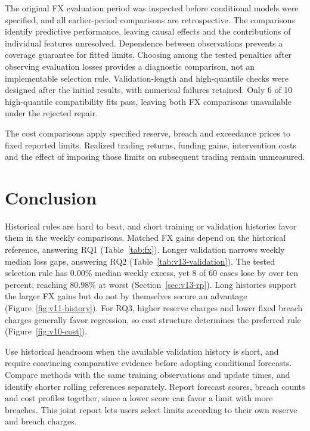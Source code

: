 \documentclass[11pt,a4paper]{article}
\begin{document}
The original FX evaluation period was inspected before conditional models were specified, and all earlier-period comparisons are retrospective. The comparisons identify predictive performance, leaving causal effects and the contributions of individual features unresolved. Dependence between observations prevents a coverage guarantee for fitted limits. Choosing among the tested penalties after observing evaluation losses provides a diagnostic comparison, not an implementable selection rule. Validation-length and high-quantile checks were designed after the initial results, with numerical failures retained. Only 6 of 10 high-quantile compatibility fits pass, leaving both FX comparisons unavailable under the rejected repair.

The cost comparisons apply specified reserve, breach and exceedance prices to fixed reported limits. Realized trading returns, funding gains, intervention costs and the effect of imposing those limits on subsequent trading remain unmeasured.

\FloatBarrier

\section{Conclusion}\label{sec:conclusion}

Historical rules are hard to beat, and short training or validation histories favor them in the weekly comparisons. Matched FX gains depend on the historical reference, answering RQ1 (Table~\ref{tab:fx}). Longer validation narrows weekly median loss gaps, answering RQ2 (Table~\ref{tab:v13-validation}). The tested selection rule has 0.00\% median weekly excess, yet 8 of 60 cases lose by over ten percent, reaching 80.98\% at worst (Section~\ref{sec:v13-rp}). Long histories support the larger FX gains but do not by themselves secure an advantage (Figure~\ref{fig:v11-history}). For RQ3, higher reserve charges and lower fixed breach charges generally favor regression, so cost structure determines the preferred rule (Figure~\ref{fig:v10-cost}).

Use historical headroom when the available validation history is short, and require convincing comparative evidence before adopting conditional forecasts. Compare methods with the same training observations and update times, and identify shorter rolling references separately. Report forecast scores, breach counts and cost profiles together, since a lower score can favor a limit with more breaches. This joint report lets users select limits according to their own reserve and breach charges.
\end{document}
